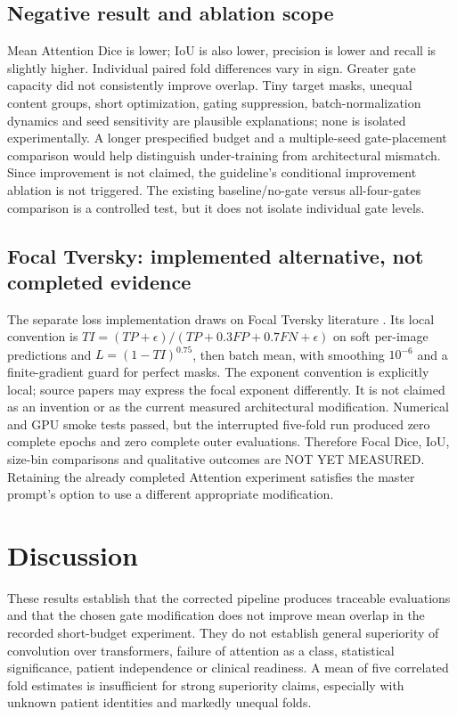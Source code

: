 \documentclass[a4paper,fleqn]{cas-sc}
\begin{document}
\subsection{Negative result and ablation scope}
Mean Attention Dice is lower; IoU is also lower, precision is lower and recall is slightly higher. Individual paired fold differences vary in sign. Greater gate capacity did not consistently improve overlap. Tiny target masks, unequal content groups, short optimization, gating suppression, batch-normalization dynamics and seed sensitivity are plausible explanations; none is isolated experimentally. A longer prespecified budget and a multiple-seed gate-placement comparison would help distinguish under-training from architectural mismatch. Since improvement is not claimed, the guideline's conditional improvement ablation is not triggered. The existing baseline/no-gate versus all-four-gates comparison is a controlled test, but it does not isolate individual gate levels.

\subsection{Focal Tversky: implemented alternative, not completed evidence}
The separate loss implementation draws on Focal Tversky literature \cite{abraham2018}. Its local convention is $TI=(TP+\epsilon)/(TP+0.3FP+0.7FN+\epsilon)$ on soft per-image predictions and $L=(1-TI)^{0.75}$, then batch mean, with smoothing $10^{-6}$ and a finite-gradient guard for perfect masks. The exponent convention is explicitly local; source papers may express the focal exponent differently. It is not claimed as an invention or as the current measured architectural modification. Numerical and GPU smoke tests passed, but the interrupted five-fold run produced zero complete epochs and zero complete outer evaluations. Therefore Focal Dice, IoU, size-bin comparisons and qualitative outcomes are NOT YET MEASURED. Retaining the already completed Attention experiment satisfies the master prompt's option to use a different appropriate modification.

\section{Discussion}
These results establish that the corrected pipeline produces traceable evaluations and that the chosen gate modification does not improve mean overlap in the recorded short-budget experiment. They do not establish general superiority of convolution over transformers, failure of attention as a class, statistical significance, patient independence or clinical readiness. A mean of five correlated fold estimates is insufficient for strong superiority claims, especially with unknown patient identities and markedly unequal folds.
\end{document}
